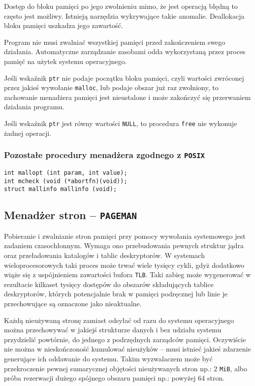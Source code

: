 \documentclass[12pt,a4paper,titlepage,twoside]{mwart}
\begin{document}
Dostęp do bloku pamięci po jego zwolnieniu mimo, że jest operacją błędną to
często jest możliwy. Istnieją narzędzia wykrywające takie anomalie. Deallokacja
bloku pamięci uszkadza jego zawartość.

Program nie musi zwalniać wszystkiej pamięci przed zakończeniem swego
działania. Automatyczne zarządzanie zasobami odda wykorzystaną przez proces
pamięć na użytek systemu operacyjnego.

Jeśli wskaźnik \texttt{ptr} nie podaje początku bloku pamięci, czyli wartości
zwróconej przez jakieś wywołanie \texttt{malloc}, lub podaje obszar już raz
zwolniony, to zachowanie menadżera pamięci jest nieustalone i może
zakończyć się przerwaniem działania programu.

Jeśli wskaźnik \texttt{ptr} jest równy wartości \texttt{NULL}, to procedura
\texttt{free} nie wykonuje żadnej operacji.

\subsubsection{Pozostałe procedury menadżera zgodnego z \texttt{POSIX}}

\vspace{2ex}
\begin{lstlisting}[caption={Prototypy pozostałych procedur i zmiennych.}]
int mallopt (int param, int value);
int mcheck (void (*abortfn)(void));
struct mallinfo mallinfo (void);
\end{lstlisting}

\newpage

\subsection{Menadżer stron -- \texttt{PAGEMAN}}

Pobieranie i zwalnianie stron pamięci przy pomocy wywołania systemowego jest
zadaniem czasochłonnym. Wymaga ono przebudowania pewnych struktur jądra oraz
przeładowania katalogów i tablic deskryptorów. W systemach wieloprocesorowych
taki proces może trwać wiele tysięcy cykli, gdyż dodatkowo wiąże się z
uspójnieniem zawartości bufora \texttt{TLB}. Taki zabieg może wygenerować w
rezultacie kilkaset tysięcy dostępów do obszarów składujących tablice
deskryptorów, których potencjalnie brak w pamięci podręcznej lub linie je
przechowujące są oznaczone jako nieaktualne.

Każdą nieużywaną stronę zamiast odsyłać od razu do systemu operacyjnego można
przechowywać w jakiejś strukturze danych i bez udziału systemu przydzielić
powtórnie, do jednego z podrzędnych zarządców pamięci. Oczywiście nie można w
nieskończoność kumulować nieużyków -- musi istnieć jakieś zdarzenie generujące
ich oddawanie do systemu. Takim wyzwalaczem może być przekroczenie pewnej
sumarycznej objętości nieużywanych stron np.: $2$ \verb+MiB+, albo próba
rezerwacji dużego spójnego obszaru pamięci np.: powyżej $64$ stron.
\end{document}
